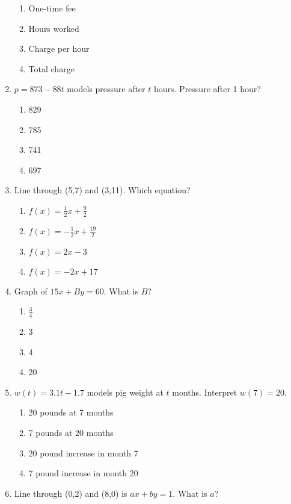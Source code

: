 \documentclass[12pt]{exam}
\begin{document}
\begin{enumerate}
    \begin{enumerate}[label=\Alph*)]
        \item One-time fee
        \item Hours worked
        \item Charge per hour
        \item Total charge
    \end{enumerate}
    \item $p = 873 - 88t$ models pressure after $t$ hours. Pressure after 1 hour?
    \begin{enumerate}[label=\Alph*)]
        \item 829
        \item 785
        \item 741
        \item 697
    \end{enumerate}
    \item Line through (5,7) and (3,11). Which equation?
    \begin{enumerate}[label=\Alph*)]
        \item $f(x) = \frac{1}{2}x + \frac{9}{2}$
        \item $f(x) = -\frac{1}{2}x + \frac{19}{2}$
        \item $f(x) = 2x - 3$
        \item $f(x) = -2x + 17$
    \end{enumerate}
    \item Graph of $15x + By = 60$. What is $B$?
    \begin{enumerate}[label=\Alph*)]
        \item $\frac{3}{4}$
        \item 3
        \item 4
        \item 20
    \end{enumerate}
    \item $w(t) = 3.1t - 1.7$ models pig weight at $t$ months. Interpret $w(7) = 20$.
    \begin{enumerate}[label=\Alph*)]
        \item 20 pounds at 7 months
        \item 7 pounds at 20 months
        \item 20 pound increase in month 7
        \item 7 pound increase in month 20
    \end{enumerate}
    \item Line through (0,2) and (8,0) is $ax + by = 1$. What is $a$?

\end{enumerate}
\end{document}
